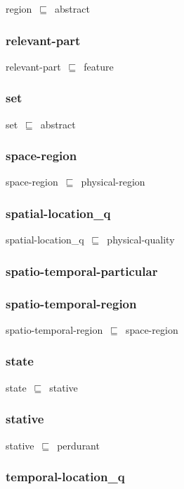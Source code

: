 \documentclass{article}
\begin{document}
region~\ensuremath{\sqsubseteq}~abstract~

\subsubsection*{relevant-part}

relevant-part~\ensuremath{\sqsubseteq}~feature~

\subsubsection*{set}

set~\ensuremath{\sqsubseteq}~abstract~

\subsubsection*{space-region}

space-region~\ensuremath{\sqsubseteq}~physical-region~

\subsubsection*{spatial-location_q}

spatial-location\_q~\ensuremath{\sqsubseteq}~physical-quality~

\subsubsection*{spatio-temporal-particular}

\subsubsection*{spatio-temporal-region}

spatio-temporal-region~\ensuremath{\sqsubseteq}~space-region~

\subsubsection*{state}

state~\ensuremath{\sqsubseteq}~stative~

\subsubsection*{stative}

stative~\ensuremath{\sqsubseteq}~perdurant~

\subsubsection*{temporal-location_q}
\end{document}
